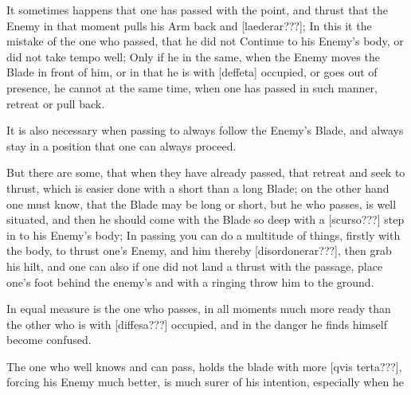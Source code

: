 It sometimes happens that one has passed with the point, and thrust
that the Enemy in that moment pulls his Arm back and [laederar???]; In
this it the mistake of the one who passed, that he did not Continue
to his Enemy's body, or did not take tempo well; Only if he in the
same, when the Enemy moves the Blade in front of him, or in that he is
with [deffeta] occupied, or goes out of presence, he cannot at the
same time, when one has passed in such manner, retreat or pull back.


It is also necessary when passing to always follow the Enemy's Blade,
and always stay in a position that one can always proceed.


But there are some, that when they have already passed, that retreat
and seek to thrust, which is easier done with a
short than a long Blade; on the other hand one must know, that the
Blade may be long or short, but he who passes, is well situated, and
then he should come with the Blade so deep with a [scurso???] step in
to his Enemy's body; In passing you can do a multitude of things,
firstly with the body, to thrust one's Enemy, and him thereby
[disordonerar???], then grab his hilt, and one can also if one did not
land a thrust with the passage, place one's foot behind the enemy's
and with a ringing throw him to the ground.


In equal measure is the one who passes, in all moments much more ready
than the other who is with [diffesa???] occupied, and in the danger he
finds himself become confused.


The one who well knows and can pass, holds the blade with more [qvis
terta???], forcing his Enemy much better, is much surer of his
intention, especially when he
